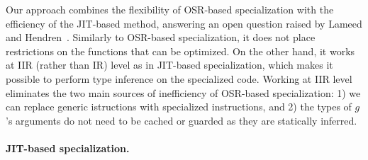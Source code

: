 

Our approach combines the flexibility of OSR-based specialization with the efficiency of the JIT-based method, answering an open question raised by Lameed and Hendren~\cite{lameed2013feval}. Similarly to OSR-based specialization, it does not place restrictions on the functions that can be optimized. On the other hand, it works at IIR (rather than IR) level as in JIT-based specialization, which makes it possible to perform type inference on the specialized code. Working at IIR level eliminates the two main sources of inefficiency of OSR-based specialization: 1) we can replace generic istructions with specialized instructions, and 2) the types of $g$'s arguments do not need to be cached or guarded as they are statically inferred.





\ifdefined\fullver
\paragraph{JIT-based specialization.}  

